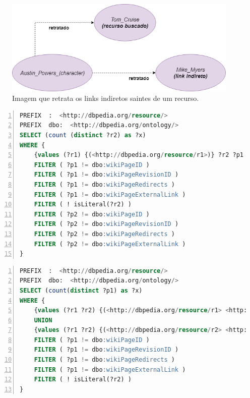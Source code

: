 \begin{figure}
	\centering
	\includegraphics[scale=0.5]{imagens/ci_links.png}
	\caption{Imagem que retrata os links indiretos saintes de um recurso.}
	\label{fig:ci_links}
\end{figure}

\begin{lstlisting}[caption=Consulta SPARQL para contagem de links indiretos., language=SQL, frame=single, label={cod:sparql_ci}, float, numbers=left]
PREFIX  :  <http://dbpedia.org/resource/>
PREFIX  dbo:  <http://dbpedia.org/ontology/>
SELECT (count (distinct ?r2) as ?x)
WHERE {
	{values (?r1) {(<http://dbpedia.org/resource/r1>)} ?r2 ?p1 ?r1 . ?r2 ?p2 ?r3 . FILTER (?r1 != ?r3 && ?r2 != ?r1 && ?r2 != ?r3)}
	FILTER ( ?p1 != dbo:wikiPageID )
	FILTER ( ?p1 != dbo:wikiPageRevisionID )
	FILTER ( ?p1 != dbo:wikiPageRedirects )
	FILTER ( ?p1 != dbo:wikiPageExternalLink )
	FILTER ( ! isLiteral(?r2) )
	FILTER ( ?p2 != dbo:wikiPageID )
	FILTER ( ?p2 != dbo:wikiPageRevisionID )
	FILTER ( ?p2 != dbo:wikiPageRedirects )
	FILTER ( ?p2 != dbo:wikiPageExternalLink )
}
\end{lstlisting}

\begin{lstlisting}[caption=Consulta SPARQL para contagem de links diretos (saíntes e entrantes) entre dois recursos., language=SQL, frame=single, label={cod:sparql_cdio}, float, numbers=left]
PREFIX  :  <http://dbpedia.org/resource/>
PREFIX  dbo:  <http://dbpedia.org/ontology/>
SELECT (count(distinct ?p1) as ?x)
WHERE {
	{values (?r1 ?r2) {(<http://dbpedia.org/resource/r1> <http://dbpedia.org/resource/France>)} ?r1 ?p1 ?r2 . FILTER (?r1 != ?r2) }
	UNION
	{values (?r1 ?r2) {(<http://dbpedia.org/resource/r2> <http://dbpedia.org/resource/Paris>)} ?r1 ?p1 ?r2 . FILTER (?r1 != ?r2) }
	FILTER ( ?p1 != dbo:wikiPageID )
	FILTER ( ?p1 != dbo:wikiPageRevisionID )
	FILTER ( ?p1 != dbo:wikiPageRedirects )
	FILTER ( ?p1 != dbo:wikiPageExternalLink )
	FILTER ( ! isLiteral(?r2) )
}
\end{lstlisting}

